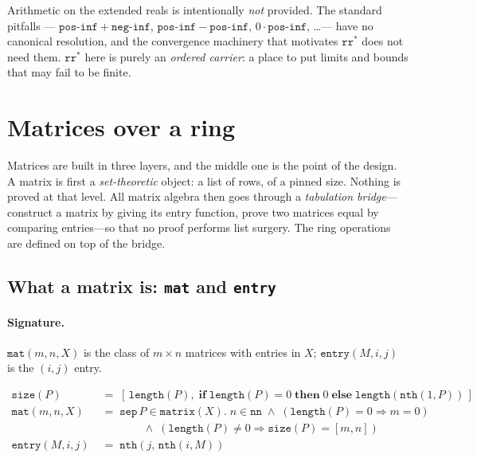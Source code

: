 \begin{remark}
Arithmetic on the extended reals is intentionally \emph{not} provided.
The standard pitfalls --- $\mathtt{pos\text{-}inf} + \mathtt{neg\text{-}inf}$,
$\mathtt{pos\text{-}inf} - \mathtt{pos\text{-}inf}$,
$0 \cdot \mathtt{pos\text{-}inf}$, \ldots --- have no canonical
resolution, and the convergence machinery that motivates
$\mathtt{rr}^{*}$ does not need them.  $\mathtt{rr}^{*}$ here is purely
an \emph{ordered carrier}: a place to put limits and bounds that may
fail to be finite.
\end{remark}

\section{Matrices over a ring}
\label{sec:matrices}

Matrices are built in three layers, and the middle one is the point of
the design.  A matrix is first a \emph{set-theoretic} object: a list of
rows, of a pinned size.  Nothing is proved at that level.  All matrix
algebra then goes through a \emph{tabulation bridge}---construct a
matrix by giving its entry function, prove two matrices equal by
comparing entries---so that no proof performs list surgery.  The ring
operations are defined on top of the bridge.

\subsection{What a matrix is: \texttt{mat} and \texttt{entry}}

\paragraph{Signature.}
$\mathtt{mat}(m, n, X)$ is the class of $m \times n$ matrices with
entries in $X$; $\mathtt{entry}(M, i, j)$ is the $(i,j)$ entry.

\begin{align*}
\mathtt{size}(P) &\;=\; [\,\mathtt{length}(P),\;
   \mathbf{if}\; \mathtt{length}(P) = 0 \;\mathbf{then}\; 0
   \;\mathbf{else}\; \mathtt{length}(\mathtt{nth}(1, P))\,] \\
\mathtt{mat}(m, n, X) &\;=\; \mathtt{sep}\, P \in \mathtt{matrix}(X).\;
   n \in \mathtt{nn} \;\wedge\;
   (\mathtt{length}(P) = 0 \Rightarrow m = 0) \\
 &\qquad\qquad \wedge\;
   (\mathtt{length}(P) \neq 0 \Rightarrow \mathtt{size}(P) = [m, n]) \\
\mathtt{entry}(M, i, j) &\;=\; \mathtt{nth}(j,\, \mathtt{nth}(i, M))
\end{align*}

